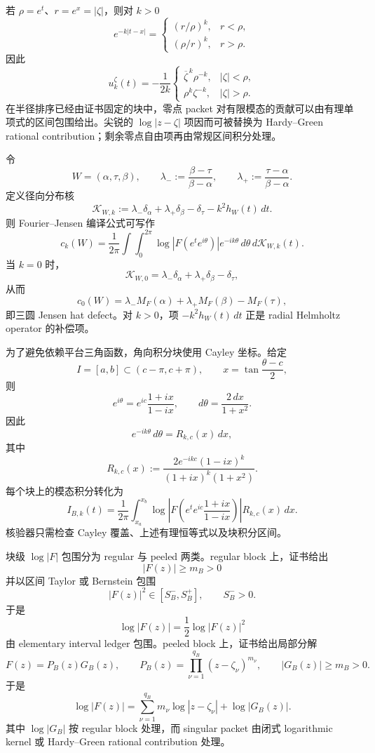 若 \(\rho=e^t\)、\(r=e^x=|\zeta|\)，则对 \(k>0\)
\[
e^{-k|t-x|}
=
\begin{cases}
(r/\rho)^k,& r<\rho,\\
(\rho/r)^k,& r>\rho.
\end{cases}
\]
因此
\[
u_k^\zeta(t)
=
-\frac1{2k}
\begin{cases}
\overline{\zeta}^{\,k}\rho^{-k},& |\zeta|<\rho,\\
\rho^k\zeta^{-k},& |\zeta|>\rho.
\end{cases}
\]
在半径排序已经由证书固定的块中，零点 packet 对有限模态的贡献可以由有理单项式的区间包围给出。尖锐的 \(\log|z-\zeta|\) 项因而可被替换为 Hardy--Green rational contribution；剩余零点自由项再由常规区间积分处理。

令
\[
W=(\alpha,\tau,\beta),
\qquad
\lambda_-:=\frac{\beta-\tau}{\beta-\alpha},
\qquad
\lambda_+:=\frac{\tau-\alpha}{\beta-\alpha}.
\]
定义径向分布核
\[
\mathscr K_{W,k}
:=
\lambda_-\delta_\alpha
+\lambda_+\delta_\beta
-\delta_\tau
-k^2h_W(t)\,dt .
\]
则 Fourier--Jensen 编译公式可写作
\[
c_k(W)
=
\frac1{2\pi}
\int
\int_0^{2\pi}
\log|F(e^te^{i\theta})|
e^{-ik\theta}\,d\theta\,d\mathscr K_{W,k}(t).
\]
当 \(k=0\) 时，
\[
\mathscr K_{W,0}
=
\lambda_-\delta_\alpha+\lambda_+\delta_\beta-\delta_\tau,
\]
从而
\[
c_0(W)
=
\lambda_-M_F(\alpha)+\lambda_+M_F(\beta)-M_F(\tau),
\]
即三圆 Jensen hat defect。对 \(k>0\)，项 \(-k^2h_W(t)\,dt\) 正是 radial Helmholtz operator 的补偿项。

为了避免依赖平台三角函数，角向积分块使用 Cayley 坐标。给定
\[
I=[a,b]\subset(c-\pi,c+\pi),
\qquad
x=\tan\frac{\theta-c}{2},
\]
则
\[
e^{i\theta}
=
e^{ic}\frac{1+ix}{1-ix},
\qquad
d\theta=\frac{2\,dx}{1+x^2}.
\]
因此
\[
e^{-ik\theta}\,d\theta
=
R_{k,c}(x)\,dx,
\]
其中
\[
R_{k,c}(x)
:=
\frac{2e^{-ikc}(1-ix)^k}
{(1+ix)^k(1+x^2)} .
\]
每个块上的模态积分转化为
\[
I_{B,k}(t)
=
\frac1{2\pi}
\int_{x_a}^{x_b}
\log\left|
F\left(
e^t e^{ic}\frac{1+ix}{1-ix}
\right)
\right|R_{k,c}(x)\,dx .
\]
核验器只需检查 Cayley 覆盖、上述有理恒等式以及块积分区间。

块级 \(\log|F|\) 包围分为 regular 与 peeled 两类。regular block 上，证书给出
\[
|F(z)|\ge m_B>0
\]
并以区间 Taylor 或 Bernstein 包围
\[
|F(z)|^2\in[S_B^-,S_B^+],
\qquad S_B^->0.
\]
于是
\[
\log|F(z)|=\frac12\log |F(z)|^2
\]
由 elementary interval ledger 包围。peeled block 上，证书给出局部分解
\[
F(z)=P_B(z)G_B(z),
\qquad
P_B(z)=\prod_{\nu=1}^{q_B}(z-\zeta_\nu)^{m_\nu},
\qquad
|G_B(z)|\ge m_B>0.
\]
于是
\[
\log|F(z)|
=
\sum_{\nu=1}^{q_B}m_\nu\log|z-\zeta_\nu|
+\log|G_B(z)|.
\]
其中 \(\log|G_B|\) 按 regular block 处理，而 singular packet 由闭式 logarithmic kernel 或 Hardy--Green rational contribution 处理。


